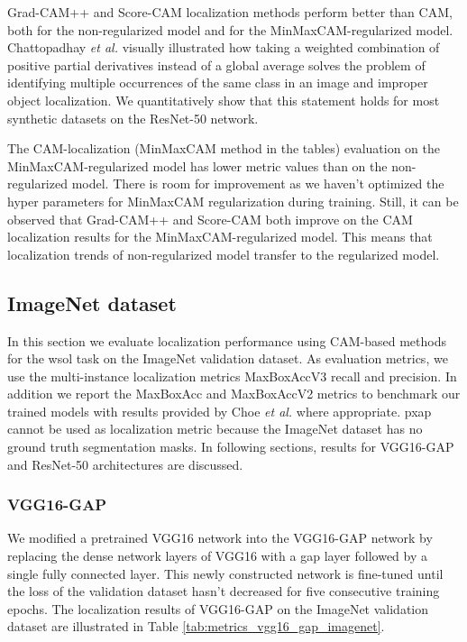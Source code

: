 Grad-CAM++ and Score-CAM localization methods perform better than CAM, both for the non-regularized model and for the MinMaxCAM-regularized model. Chattopadhay \textit{et al.} \cite{chattopadhyay2017grad} visually illustrated how taking a weighted combination of positive partial derivatives instead of a global average solves the problem of identifying multiple occurrences of the same class in an image and improper object localization. We quantitatively show that this statement holds for most synthetic datasets on the ResNet-50 network.

The CAM-localization (MinMaxCAM method in the tables) evaluation on the MinMaxCAM-regularized model has lower metric values than on the non-regularized model. There is room for improvement as we haven't optimized the hyper parameters for MinMaxCAM regularization during training. Still, it can be observed that Grad-CAM++ and Score-CAM both improve on the CAM localization results for the MinMaxCAM-regularized model. This means that localization trends of non-regularized model transfer to the regularized model.

\subsection{ImageNet dataset}
In this section we evaluate localization performance using CAM-based methods for the \acrshort{wsol} task on the ImageNet validation dataset. As evaluation metrics, we use the multi-instance localization metrics MaxBoxAccV3 recall and precision. In addition we report the MaxBoxAcc and MaxBoxAccV2 metrics to benchmark our trained models with results provided by Choe \textit{et al.} \cite{choe2020evaluating} where appropriate. \acrfull{pxap} cannot be used as localization metric because the ImageNet dataset has no ground truth segmentation masks. In following sections, results for VGG16-GAP and ResNet-50 architectures are discussed.

\subsubsection{VGG16-GAP}
We modified a pretrained VGG16 network into the VGG16-GAP network by replacing the dense network layers of VGG16 with a \acrshort{gap} layer followed by a single fully connected layer. This newly constructed network is fine-tuned until the loss of the validation dataset hasn't decreased for five consecutive training epochs. The localization results of VGG16-GAP on the ImageNet validation dataset are illustrated in Table \ref{tab:metrics_vgg16_gap_imagenet}.


